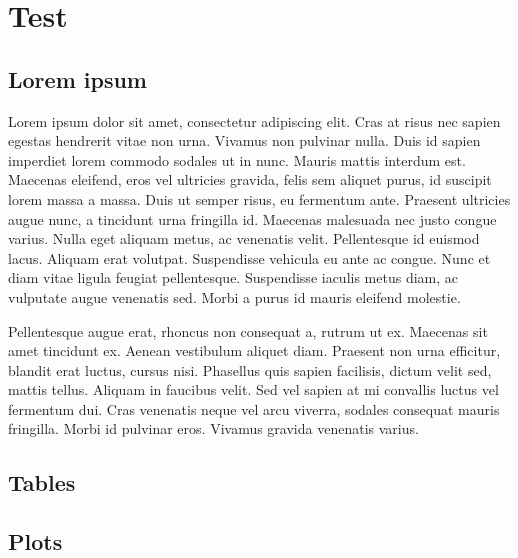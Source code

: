 \documentclass{doctor}
\begin{document}


\newpage

\pagestyle{doctor}

\chapter{Test}

\section{Lorem ipsum}

Lorem ipsum dolor sit amet, consectetur adipiscing elit. Cras at risus nec sapien egestas hendrerit vitae non urna. Vivamus non pulvinar nulla. Duis id sapien imperdiet lorem commodo sodales ut in nunc. Mauris mattis interdum est. Maecenas eleifend, eros vel ultricies gravida, felis sem aliquet purus, id suscipit lorem massa a massa. Duis ut semper risus, eu fermentum ante. Praesent ultricies augue nunc, a tincidunt urna fringilla id. Maecenas malesuada nec justo congue varius. Nulla eget aliquam metus, ac venenatis velit. Pellentesque id euismod lacus. Aliquam erat volutpat. Suspendisse vehicula eu ante ac congue. Nunc et diam vitae ligula feugiat pellentesque. Suspendisse iaculis metus diam, ac vulputate augue venenatis sed. Morbi a purus id mauris eleifend molestie.

Pellentesque augue erat, rhoncus non consequat a, rutrum ut ex. Maecenas sit amet tincidunt ex. Aenean vestibulum aliquet diam. Praesent non urna efficitur, blandit erat luctus, cursus nisi. Phasellus quis sapien facilisis, dictum velit sed, mattis tellus. Aliquam in faucibus velit. Sed vel sapien at mi convallis luctus vel fermentum dui. Cras venenatis neque vel arcu viverra, sodales consequat mauris fringilla. Morbi id pulvinar eros. Vivamus gravida venenatis varius.

\newpage

\section{Tables}



\section{Plots}


\end{document}
